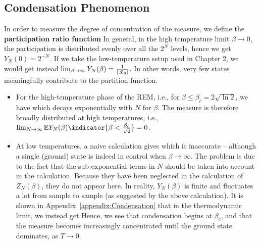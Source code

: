 \documentclass[letterpaper,english,10pt]{article}
\begin{document}
\subsection{Condensation Phenomenon}
In order to measure the degree of concentration of the measure, we define the \textbf{participation ratio function}
In general, in the high temperature limit $\beta \to 0$, the participation is distributed evenly over all the $2^N$ levels,
hence we get $Y_N (0) = 2^{-N}$. 
If we take the low-temperature setup used in Chapter 2, we would get instead $\lim_{\beta \to \infty}Y_N(\beta) = \frac{1}{\left\lvert\mathscr{X}_0\right\rvert}$. 
In other words, very few states meaningfully contribute to the partition function.
\begin{itemize}
\item For the high-temperature phase of the REM, i.e., for $\beta \le \beta_c = 2\sqrt{\ln2}$, we have
which decays exponentially with $N$ for $\beta $. 
The measure is therefore broadly distributed at high temperatures, i.e., $\lim_{N \to \infty}\E Y_N(\beta)\indicator{\beta  < \frac{\beta_c}{\sqrt{2}}} = 0$. 
 
 \item At low temperatures, a naive calculation gives
which is inaccurate -- although a single (ground) state is indeed in control when $\beta \to \infty$. 
The problem is due to the fact that the sub-exponential terms in $N$ should be taken into account in the calculation. 
Because they have been neglected in the calculation of $Z_N(\beta)$, they do not appear here. 
In reality, $Y_N (\beta)$ is finite and fluctuates a lot from sample to sample (as suggested by the above calculation). 
It is shown in Appendix~\ref{appendix:Condensation} that in the thermodynamic limit, we instead get
Hence, we see that condensation begins at $\beta_c$, and that the measure becomes increasingly concentrated until the ground state dominates, as $T \to 0$.  
\end{itemize}
\end{document}
